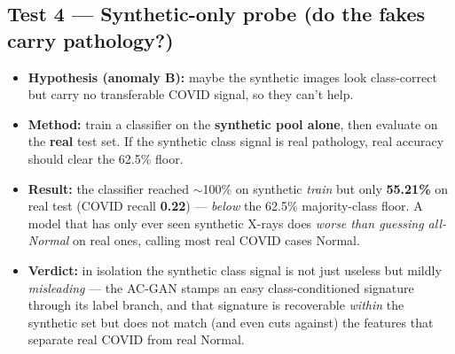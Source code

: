 \documentclass[11pt]{article}
\begin{document}
\subsection{Test 4 --- Synthetic-only probe (do the fakes carry pathology?)}
\begin{itemize}[nosep,leftmargin=1.4em]
  \item \textbf{Hypothesis (anomaly B):} maybe the synthetic images look
        class-correct but carry no transferable COVID signal, so they can't help.
  \item \textbf{Method:} train a classifier on the \textbf{synthetic pool alone},
        then evaluate on the \textbf{real} test set. If the synthetic class signal
        is real pathology, real accuracy should clear the 62.5\% floor.
  \item \textbf{Result:} the classifier reached $\sim$100\% on synthetic
        \emph{train} but only \textbf{55.21\%} on real test (COVID recall
        \textbf{0.22}) --- \emph{below} the 62.5\% majority-class floor. A model
        that has only ever seen synthetic X-rays does \emph{worse than guessing
        all-Normal} on real ones, calling most real COVID cases Normal.
  \item \textbf{Verdict:} in isolation the synthetic class signal is not just
        useless but mildly \emph{misleading} --- the AC-GAN stamps an easy
        class-conditioned signature through its label branch, and that signature is
        recoverable \emph{within} the synthetic set but does not match (and even
        cuts against) the features that separate real COVID from real Normal.
\end{itemize}
\end{document}
